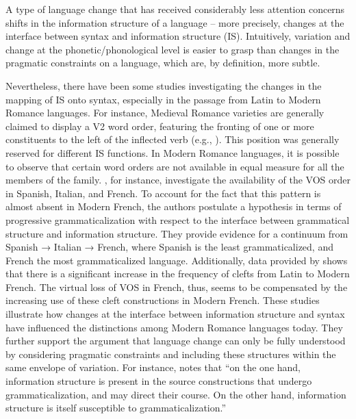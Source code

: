 A type of language change that has received considerably less attention concerns shifts in the information structure of a language -- more precisely, changes at the interface between syntax and information structure (IS). Intuitively, variation and change at the phonetic/phonological level is easier to grasp than changes in the pragmatic constraints on a language, which are, by definition, more subtle.

Nevertheless, there have been some studies investigating the changes in the mapping of IS onto syntax, especially in the passage from Latin to Modern Romance languages. For instance, Medieval Romance varieties are generally claimed to display a V2 word order, featuring the fronting of one or more constituents to the left of the inflected verb (e.g., \cite{beninca2006detailed, ledgeway2012latin, salvi2011some, wolfe2015medieval, wolfe2024conspiracy}). This position was generally reserved for different IS functions. In Modern Romance languages, it is possible to observe that certain word orders are not available in equal measure for all the members of the family. 
\textcite{lahousse2012word}, for instance, investigate the availability of the VOS order in Spanish, Italian, and French. 
To account for the fact that this pattern is almost absent in Modern French, the authors postulate a hypothesis in terms of progressive grammaticalization with respect to the interface between grammatical structure and information structure. They provide evidence for a continuum from Spanish → Italian → French, where Spanish is the least grammaticalized, and French the most grammaticalized language. Additionally, data provided by \textcite{dufter2008explaining} shows that there is a significant increase in the frequency of clefts from Latin to Modern French. The virtual loss of VOS in French, thus, seems to be compensated by the increasing use of these cleft constructions in Modern French. These studies illustrate how changes at the interface between information structure and syntax have influenced the distinctions among Modern Romance languages today. They further support the argument that language change can only be fully understood by considering pragmatic constraints and including these structures within the same envelope of variation.
For instance, \textcite[1]{lehmann2008grammaticalization} notes that ``on the one hand, information structure is present in the source constructions that undergo grammaticalization, and may direct their course. On the other hand, information structure is itself susceptible to grammaticalization.” 

